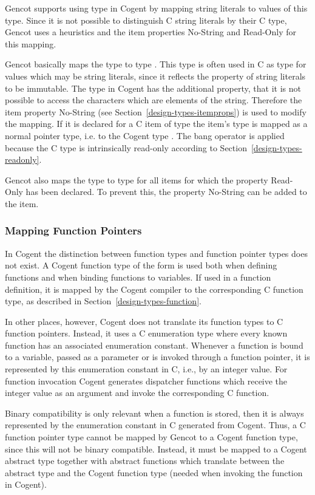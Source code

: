 Gencot supports using type  in Cogent by mapping string literals to values of this type.
Since it is not possible to distinguish C string literals by their C type, Gencot uses a heuristics and the item
properties No-String and Read-Only for this mapping.

Gencot basically maps the type  to type . This type is often used in C as type
for values which may be string literals, since it reflects the property of string literals to be immutable.
The  type in Cogent has the additional property, that it is not possible to access the characters
which are elements of the string. Therefore the item property No-String (see Section~\ref{design-types-itemprops})
is used to modify the mapping. If it is declared for a C item of type  the item's type is
mapped as a normal pointer type, i.e. to the Cogent type . The bang operator is applied because
the C type is intrinsically read-only according to Section~\ref{design-types-readonly}.

Gencot also maps the type  to type  for all items for which the property Read-Only has
been declared. To prevent this, the property No-String can be added to the item.

\subsubsection{Mapping Function Pointers}

In Cogent the distinction between function types and function pointer types does not exist. 
A Cogent function type of the form  is used both when
defining functions and when binding functions to variables. If used in a function definition, it is mapped by
the Cogent compiler to the corresponding C function type, as described in Section~\ref{design-types-function}.

In other places, however, Cogent does not translate its function types to C function pointers. Instead, it uses 
a C enumeration type where every known function has an associated enumeration constant. Whenever a 
function is bound to a variable, passed as a parameter or is invoked through a function pointer, it is 
represented by this enumeration constant in C, i.e., by an integer value.
For function invocation Cogent generates dispatcher functions which receive the integer value as an argument
and invoke the corresponding C function. 

Binary compatibility is only relevant when a function is stored, then it is always represented by the enumeration
constant in C generated from Cogent. Thus, a C function pointer type cannot be mapped by Gencot to a Cogent function type,
since this will not be binary compatible. Instead, it must be mapped to a Cogent abstract type together with 
abstract functions which translate between the abstract type and the Cogent function type (needed when invoking 
the function in Cogent).

